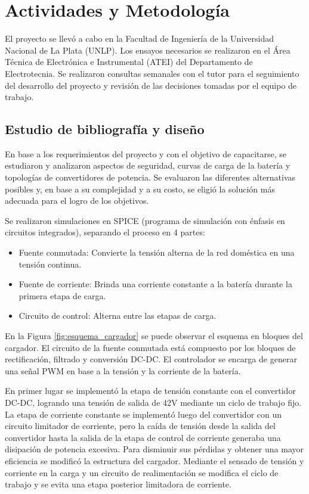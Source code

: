 \section{Actividades y Metodología}


El proyecto se llevó a cabo en la Facultad de Ingeniería de la Universidad Nacional de La Plata (UNLP).
Los ensayos necesarios se realizaron en el Área Técnica de Electrónica e Instrumental (ATEI) del Departamento de Electrotecnia.
Se realizaron consultas semanales con el tutor para el seguimiento del desarrollo del proyecto y
revisión de las decisiones tomadas por el equipo de trabajo.

\subsection{Estudio de bibliografía y diseño} \label{subsection:estudio_bibliografia}

En base a los requerimientos del proyecto y con el objetivo de capacitarse, se estudiaron y analizaron aspectos de seguridad, 
curvas de carga de la batería y topologías de convertidores de potencia. 
Se evaluaron las diferentes alternativas posibles y, en base a su complejidad y a su costo,
se eligió la solución más adecuada para el logro de los objetivos. 

Se realizaron simulaciones en SPICE (programa de simulación con énfasis en circuitos integrados),
separando el proceso en 4 partes:
\begin{itemize}
    \item Fuente conmutada: Convierte la tensión alterna de la red doméstica en una tensión continua.
    \item Fuente de corriente: Brinda una corriente constante a la batería durante la primera etapa de carga.
    \item Circuito de control: Alterna entre las etapas de carga.
\end{itemize}

En la Figura \ref{fig:esquema_cargador} se puede observar el esquema en bloques del cargador.
El circuito de la fuente conmutada está compuesto por los bloques de rectificación, filtrado y conversión DC-DC.
El controlador se encarga de generar una señal PWM en base a la tensión y la corriente de la batería.

En primer lugar se implementó la etapa de tensión constante con el convertidor DC-DC, logrando una tensión de salida de 42V mediante un ciclo de trabajo fijo. 
La etapa de corriente constante se implementó luego del convertidor con un circuito limitador de corriente,
pero la caída de tensión desde la salida del convertidor hasta la salida de la etapa de control de corriente generaba una disipación de potencia excesiva.
Para disminuir sus pérdidas y obtener una mayor eficiencia se modificó la estructura del cargador. 
Mediante el sensado de tensión y corriente en la carga y un circuito de realimentación se modifica el ciclo de trabajo y se evita una etapa posterior limitadora de corriente.

